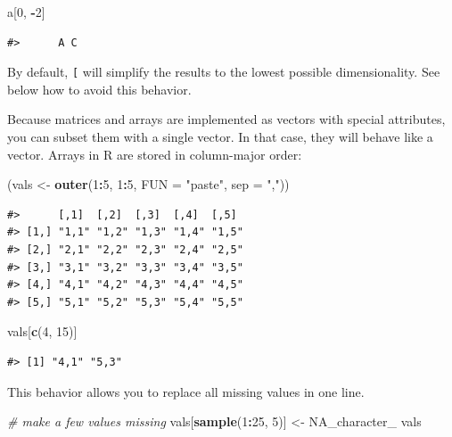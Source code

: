 \documentclass[]{book}
\newenvironment{Shaded}{\begin{snugshade}}{\end{snugshade}}
\newcommand{\KeywordTok}[1]{\textcolor[rgb]{0.13,0.29,0.53}{\textbf{#1}}}
\newcommand{\DataTypeTok}[1]{\textcolor[rgb]{0.13,0.29,0.53}{#1}}
\newcommand{\DecValTok}[1]{\textcolor[rgb]{0.00,0.00,0.81}{#1}}
\newcommand{\StringTok}[1]{\textcolor[rgb]{0.31,0.60,0.02}{#1}}
\newcommand{\CommentTok}[1]{\textcolor[rgb]{0.56,0.35,0.01}{\textit{#1}}}
\newcommand{\OtherTok}[1]{\textcolor[rgb]{0.56,0.35,0.01}{#1}}
\newcommand{\OperatorTok}[1]{\textcolor[rgb]{0.81,0.36,0.00}{\textbf{#1}}}
\newcommand{\NormalTok}[1]{#1}
\theoremstyle{definition}
\theoremstyle{definition}
\theoremstyle{definition}
\theoremstyle{remark}
\begin{document}
\begin{Shaded}
\begin{Highlighting}[]
\NormalTok{a[}\DecValTok{0}\NormalTok{, }\OperatorTok{-}\DecValTok{2}\NormalTok{]}
\end{Highlighting}
\end{Shaded}

\begin{verbatim}
#>      A C
\end{verbatim}

By default, \texttt{{[}} will simplify the results to the lowest
possible dimensionality. See below how to avoid this behavior.

Because matrices and arrays are implemented as vectors with special
attributes, you can subset them with a single vector. In that case, they
will behave like a vector. Arrays in R are stored in column-major order:

\begin{Shaded}
\begin{Highlighting}[]
\NormalTok{(vals <-}\StringTok{ }\KeywordTok{outer}\NormalTok{(}\DecValTok{1}\OperatorTok{:}\DecValTok{5}\NormalTok{, }\DecValTok{1}\OperatorTok{:}\DecValTok{5}\NormalTok{, }\DataTypeTok{FUN =} \StringTok{"paste"}\NormalTok{, }\DataTypeTok{sep =} \StringTok{","}\NormalTok{))}
\end{Highlighting}
\end{Shaded}

\begin{verbatim}
#>      [,1]  [,2]  [,3]  [,4]  [,5] 
#> [1,] "1,1" "1,2" "1,3" "1,4" "1,5"
#> [2,] "2,1" "2,2" "2,3" "2,4" "2,5"
#> [3,] "3,1" "3,2" "3,3" "3,4" "3,5"
#> [4,] "4,1" "4,2" "4,3" "4,4" "4,5"
#> [5,] "5,1" "5,2" "5,3" "5,4" "5,5"
\end{verbatim}

\begin{Shaded}
\begin{Highlighting}[]
\NormalTok{vals[}\KeywordTok{c}\NormalTok{(}\DecValTok{4}\NormalTok{, }\DecValTok{15}\NormalTok{)]}
\end{Highlighting}
\end{Shaded}

\begin{verbatim}
#> [1] "4,1" "5,3"
\end{verbatim}

This behavior allows you to replace all missing values in one line.

\begin{Shaded}
\begin{Highlighting}[]
\CommentTok{# make a few values missing}
\NormalTok{vals[}\KeywordTok{sample}\NormalTok{(}\DecValTok{1}\OperatorTok{:}\DecValTok{25}\NormalTok{, }\DecValTok{5}\NormalTok{)] <-}\StringTok{ }\OtherTok{NA_character_}
\NormalTok{vals}
\end{Highlighting}
\end{Shaded}
\end{document}
